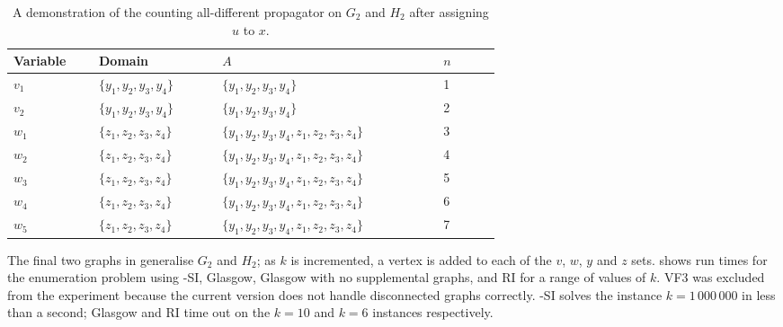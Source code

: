 \begin{table}[htb]
\centering
\footnotesize
    \begin{tabular}{p{0.09\linewidth} p{0.16\linewidth} p{0.3\linewidth} p{0.08\linewidth}}
 \toprule
     Variable & Domain & $A$ & $n$\\ [0.5ex]
 \midrule
     $v_1$ & $\{y_1,y_2,y_3,y_4\}$ & $\{y_1,y_2,y_3,y_4\}$ & 1\\
     $v_2$ & $\{y_1,y_2,y_3,y_4\}$ & $\{y_1,y_2,y_3,y_4\}$ & 2\\
     $w_1$ & $\{z_1,z_2,z_3,z_4\}$ & $\{y_1,y_2,y_3,y_4,z_1,z_2,z_3,z_4\}$ & 3\\
     $w_2$ & $\{z_1,z_2,z_3,z_4\}$ & $\{y_1,y_2,y_3,y_4,z_1,z_2,z_3,z_4\}$ & 4\\
     $w_3$ & $\{z_1,z_2,z_3,z_4\}$ & $\{y_1,y_2,y_3,y_4,z_1,z_2,z_3,z_4\}$ & 5\\
     $w_4$ & $\{z_1,z_2,z_3,z_4\}$ & $\{y_1,y_2,y_3,y_4,z_1,z_2,z_3,z_4\}$ & 6\\
     $w_5$ & $\{z_1,z_2,z_3,z_4\}$ & $\{y_1,y_2,y_3,y_4,z_1,z_2,z_3,z_4\}$ & 7\\
 \bottomrule
\end{tabular}
\caption{A demonstration of the counting all-different propagator on $G_2$ and $H_2$
    after assigning $u$ to $x$.}
\label{tab:counting-all-diff}
\end{table}

The final two graphs in  generalise $G_2$ and $H_2$; as $k$ is incremented,
a vertex is added to each of the $v$, $w$, $y$ and $z$ sets.
 shows run times for the enumeration problem
using \McSplit-SI, Glasgow, Glasgow with no supplemental graphs, and RI for a range of values of $k$.
VF3 was excluded from the experiment because the current version does not handle disconnected graphs correctly.
\McSplit-SI solves the instance $k=1\,000\,000$ in less than a second;
Glasgow and RI time out on the $k=10$ and $k=6$ instances respectively.

